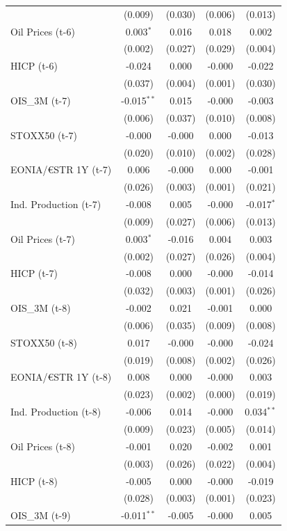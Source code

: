 \begin{longtable}[t]{lcccc}
 & (0.009) & (0.030) & (0.006) & (0.013)\\
Oil Prices (t-6) & 0.003$^{*}$ & 0.016 & 0.018 & 0.002\\
 & (0.002) & (0.027) & (0.029) & (0.004)\\
HICP (t-6) & -0.024 & 0.000 & -0.000 & -0.022\\
 & (0.037) & (0.004) & (0.001) & (0.030)\\
OIS\_3M (t-7) & -0.015$^{**}$ & 0.015 & -0.000 & -0.003\\
 & (0.006) & (0.037) & (0.010) & (0.008)\\
STOXX50 (t-7) & -0.000 & -0.000 & 0.000 & -0.013\\
 & (0.020) & (0.010) & (0.002) & (0.028)\\
EONIA/€STR 1Y (t-7) & 0.006 & -0.000 & 0.000 & -0.001\\
 & (0.026) & (0.003) & (0.001) & (0.021)\\
Ind. Production (t-7) & -0.008 & 0.005 & -0.000 & -0.017$^{*}$\\
 & (0.009) & (0.027) & (0.006) & (0.013)\\
Oil Prices (t-7) & 0.003$^{*}$ & -0.016 & 0.004 & 0.003\\
 & (0.002) & (0.027) & (0.026) & (0.004)\\
HICP (t-7) & -0.008 & 0.000 & -0.000 & -0.014\\
 & (0.032) & (0.003) & (0.001) & (0.026)\\
OIS\_3M (t-8) & -0.002 & 0.021 & -0.001 & 0.000\\
 & (0.006) & (0.035) & (0.009) & (0.008)\\
STOXX50 (t-8) & 0.017 & -0.000 & -0.000 & -0.024\\
 & (0.019) & (0.008) & (0.002) & (0.026)\\
EONIA/€STR 1Y (t-8) & 0.008 & 0.000 & -0.000 & 0.003\\
 & (0.023) & (0.002) & (0.000) & \vphantom{1} (0.019)\\
Ind. Production (t-8) & -0.006 & 0.014 & -0.000 & 0.034$^{**}$\\
 & (0.009) & (0.023) & (0.005) & (0.014)\\
Oil Prices (t-8) & -0.001 & 0.020 & -0.002 & 0.001\\
 & (0.003) & (0.026) & (0.022) & (0.004)\\
HICP (t-8) & -0.005 & 0.000 & -0.000 & -0.019\\
 & (0.028) & (0.003) & (0.001) & (0.023)\\
OIS\_3M (t-9) & -0.011$^{**}$ & -0.005 & -0.000 & 0.005\\

\end{longtable}

